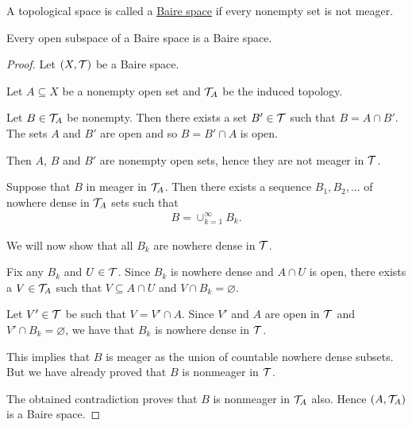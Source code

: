 \begin{definition}\label{def:baire_space}
  A topological space is called a \uline{Baire space} if every nonempty set is not meager.
\end{definition}

\begin{proposition}\label{thm:open_subspace_of_baire_space_is_baire}
  Every open subspace of a Baire space is a Baire space.
\end{proposition}
\begin{proof}
  Let $(X, \mathcal T)$ be a Baire space.

  Let $A \subseteq X$ be a nonempty open set and $\mathcal T_A$ be the induced topology.

  Let $B \in \mathcal T_A$ be nonempty. Then there exists a set $B' \in \mathcal T$ such that $B = A \cap B'$. The sets $A$ and $B'$ are open and so $B = B' \cap A$ is open.

  Then $A$, $B$ and $B'$ are nonempty open sets, hence they are not meager in $\mathcal T$.

  Suppose that $B$ in meager in $\mathcal T_A$. Then there exists a sequence $B_1, B_2, \ldots$ of nowhere dense in $\mathcal T_A$ sets such that
  \begin{align*}
    B = \cup_{k=1}^\infty B_k.
  \end{align*}

  We will now show that all $B_k$ are nowhere dense in $\mathcal T$.

  Fix any $B_k$ and $U \in \mathcal T$. Since $B_k$ is nowhere dense and $A \cap U$ is open, there exists a $V \in \mathcal T_A$ such that $V \subseteq A \cap U$ and $V \cap B_k = \varnothing$.

  Let $V' \in \mathcal T$ be such that $V = V' \cap A$. Since $V'$ and $A$ are open in $\mathcal T$ and $V' \cap B_k = \varnothing$, we have that $B_k$ is nowhere dense in $\mathcal T$.

  This implies that $B$ is meager as the union of countable nowhere dense subsets. But we have already proved that $B$ is nonmeager in $\mathcal T$.

  The obtained contradiction proves that $B$ is nonmeager in $\mathcal T_A$ also. Hence $(A, \mathcal T_A)$ is a Baire space.
\end{proof}
